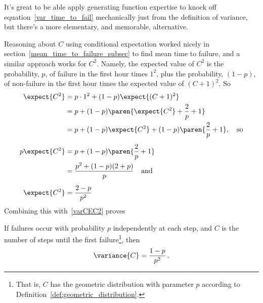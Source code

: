 It's great to be able apply generating function expertise to knock off
equation~\eqref{var_time_to_fail} mechanically just from the definition of
variance, but there's a more elementary, and memorable, alternative.\fi

Reasoning about $C$ using conditional expectation worked nicely in
section~\ref{mean_time_to_failure_subsec} to find mean time to
failure, and a similar approach works for $C^2$.  Namely, the expected
value of $C^2$ is the probability, $p$, of failure in the first hour
times $1^2$, plus the probability, $(1-p)$, of non-failure in the
first hour times the expected value of $(C+1)^2$.  So
\begin{align*}
\expect{C^2} & = p\cdot 1^2 + (1-p)\expect{(C+1)^2}\\
             & = p + (1-p) \paren{\expect{C^2} + \frac{2}{p} +1}\\
             & = p+ (1-p)\expect{C^2} + (1-p)\paren{\frac{2}{p} + 1},
                \quad\text{so}\\[5pt]
p \expect{C^2} & = p+ (1-p)\paren{\frac{2}{p} + 1}\\
               & = \frac{p^2+(1-p)(2+p)}{p} \quad\text{and}\\[5pt]
\expect{C^2} & = \frac{2 -p}{p^2} %
\end{align*}
Combining this with~\eqref{varCEC2} proves
\begin{lemma}\label{lem:var_time_to_fail}
If failures occur with probability $p$ independently at each step, and
$C$ is the number of steps until the first failure\footnote{That is,
  $C$ has the geometric distribution with parameter $p$ according to
  Definition~\ref{def:geometric_distribution}.}, then
\begin{equation}\label{var_time_to_fail}
\variance{C} = \frac{1-p}{p^2} \,.
\end{equation}
\end{lemma}

